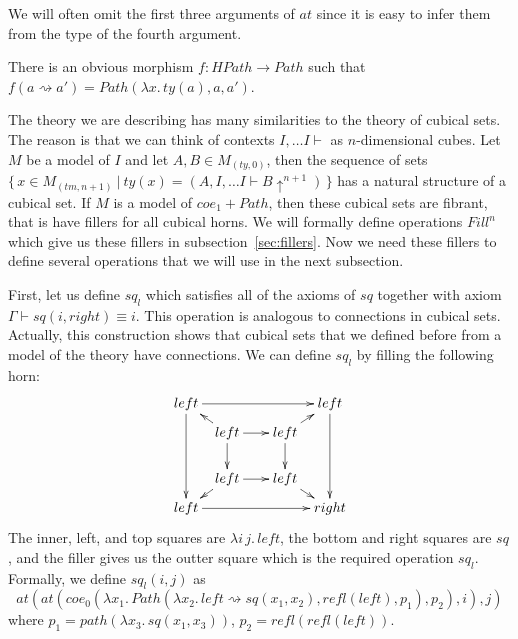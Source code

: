 \documentclass[reqno]{amsart}
\theoremstyle{definition}
\theoremstyle{remark}
\newcommand{\deq}{\equiv}
\newcommand{\idtype}{\rightsquigarrow}
\numberwithin{figure}{section}
\begin{document}
We will often omit the first three arguments of $at$ since it is easy to infer them from the type of the fourth argument.

There is an obvious morphism $f : HPath \to Path$ such that $f(a \idtype a') = Path(\lambda x.\,ty(a), a, a')$.

The theory we are describing has many similarities to the theory of cubical sets.
The reason is that we can think of contexts $I, \ldots I \vdash$ as $n$-dimensional cubes.
Let $M$ be a model of $I$ and let $A,B \in M_{(ty,0)}$, then the sequence of sets
$\{\,x \in M_{(tm,n+1)}\ |\ ty(x) = (A, I, \ldots I \vdash B\!\uparrow^{n+1})\,\}$ has a natural structure of a cubical set.
If $M$ is a model of $coe_1 + Path$, then these cubical sets are fibrant, that is have fillers for all cubical horns.
We will formally define operations $Fill^n$ which give us these fillers in subsection~\ref{sec:fillers}.
Now we need these fillers to define several operations that we will use in the next subsection.

First, let us define $sq_l$ which satisfies all of the axioms of $sq$ together with axiom $\Gamma \vdash sq(i,right) \deq i$.
This operation is analogous to connections in cubical sets.
Actually, this construction shows that cubical sets that we defined before from a model of the theory have connections.
We can define $sq_l$ by filling the following horn:
\[ \xymatrix @C=0.5pc @R=0.5pc
    { left \ar[rrrr] \ar[dddd] &          & &                      & left \ar[dddd] \\
           & left \ar[rr] \ar[dd] \ar[ul] & & left \ar[dd] \ar[ur] & \\
           &                              & &                      & \\
           & left \ar[rr] \ar[dl]         & & left \ar[dr]         & \\
      left \ar[rrrr]           &          & &                      & right
    }\]
The inner, left, and top squares are $\lambda i\,j.\,left$, the bottom and right squares are $sq$,
and the filler gives us the outter square which is the required operation $sq_l$.
Formally, we define $sq_l(i,j)$ as
\[ at(at(coe_0(\lambda x_1.\,Path(\lambda x_2.\,left \idtype sq(x_1,x_2), refl(left), p_1), p_2),i),j) \]
where $p_1 = path(\lambda x_3.\,sq(x_1,x_3))$, $p_2 = refl(refl(left))$.
\end{document}
